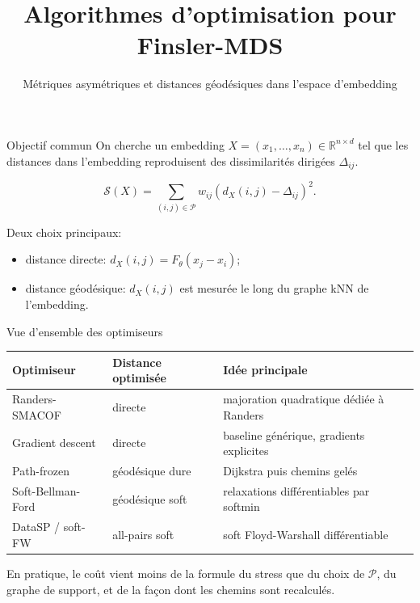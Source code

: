 \documentclass[aspectratio=169]{beamer}
\title[Finsler-MDS]{Algorithmes d'optimisation pour Finsler-MDS}
\subtitle{Métriques asymétriques et distances géodésiques dans l'espace d'embedding}
\author{}
\date{}
\newcommand{\R}{\mathbb{R}}
\newcommand{\Dtarget}{\Delta}
\newcommand{\Fmetric}{F_\theta}
\newcommand{\stress}{\mathcal{S}}
\begin{document}
\begin{frame}
  \titlepage
\end{frame}

\begin{frame}{Objectif commun}
  On cherche un embedding $X=(x_1,\ldots,x_n)\in \R^{n\times d}$ tel que
  les distances dans l'embedding reproduisent des dissimilarités dirigées
  $\Dtarget_{ij}$.

  \vspace{0.4cm}
  \[
    \stress(X)
    =
    \sum_{(i,j)\in \mathcal{P}}
    w_{ij}
    \left(d_X(i,j)-\Dtarget_{ij}\right)^2 .
  \]

  \vspace{0.2cm}
  Deux choix principaux:
  \begin{itemize}
    \item distance directe: $d_X(i,j)=\Fmetric(x_j-x_i)$;
    \item distance géodésique: $d_X(i,j)$ est mesurée le long du graphe kNN de l'embedding.
  \end{itemize}
\end{frame}

\begin{frame}{Vue d'ensemble des optimiseurs}
  \begin{table}
    \centering
    \begin{tabular}{lll}
      \toprule
      Optimiseur & Distance optimisée & Idée principale \\
      \midrule
      Randers-SMACOF & directe & majoration quadratique dédiée à Randers \\
      Gradient descent & directe & baseline générique, gradients explicites \\
      Path-frozen & géodésique dure & Dijkstra puis chemins gelés \\
      Soft-Bellman-Ford & géodésique soft & relaxations différentiables par softmin \\
      DataSP / soft-FW & all-pairs soft & soft Floyd-Warshall différentiable \\
      \bottomrule
    \end{tabular}
  \end{table}

  \vspace{0.2cm}
  En pratique, le coût vient moins de la formule du stress que du choix de
  $\mathcal{P}$, du graphe de support, et de la façon dont les chemins sont
  recalculés.
\end{frame}
\end{document}
